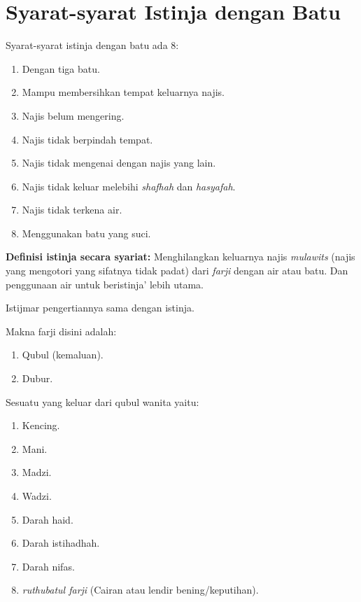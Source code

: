 \chapter{Syarat-syarat Istinja dengan Batu}

\begin{matanbox}[Matan]
Syarat-syarat istinja dengan batu ada 8:

\begin{enumerate}
    \item Dengan tiga batu.
    \item Mampu membersihkan tempat keluarnya najis.
    \item Najis belum mengering. 
    \item Najis tidak berpindah tempat.
    \item Najis tidak mengenai dengan najis yang lain.
    \item Najis tidak keluar melebihi \textit{shafhah} dan \textit{hasyafah}. 
    \item Najis tidak terkena air.
    \item Menggunakan batu yang suci.
\end{enumerate}
\end{matanbox}

\textbf{Definisi istinja secara syariat:} Menghilangkan keluarnya najis \textit{mulawits} (najis yang mengotori yang sifatnya tidak padat) dari \textit{farji} dengan air atau batu. Dan penggunaan air untuk beristinja’ lebih utama.

Istijmar pengertiannya sama dengan istinja.

Makna farji disini adalah:
\begin{enumerate}
    \item Qubul (kemaluan).
    \item Dubur.
\end{enumerate}

Sesuatu yang keluar dari qubul wanita yaitu: 
\begin{enumerate}
    \item Kencing.
    \item Mani.
    \item Madzi. 
    \item Wadzi. 
    \item Darah haid.
    \item Darah istihadhah. 
    \item Darah nifas. 
    \item \textit{ruthubatul farji} (Cairan atau lendir bening/keputihan).
\end{enumerate} 


